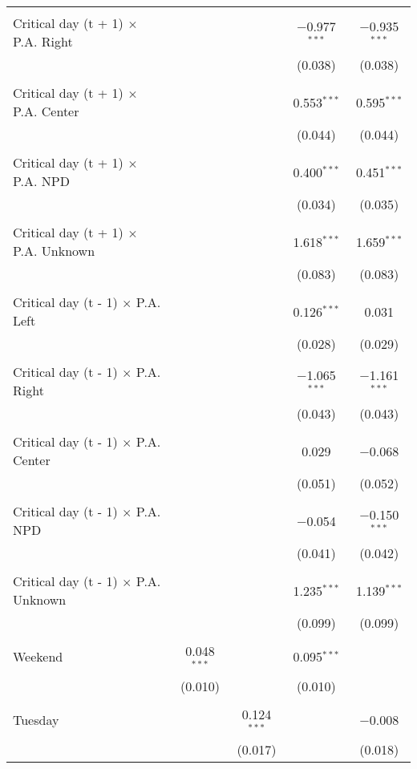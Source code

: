 \documentclass[
]{article}
\begin{document}
\begin{table}[!htbp]
{\begin{tabular}{@{\extracolsep{5pt}}lcccc}
  & & & & \\ 
 Critical day (t + 1) $\times$ P.A. Right &  &  & $-$0.977$^{***}$ & $-$0.935$^{***}$ \\ 
  &  &  & (0.038) & (0.038) \\ 
  & & & & \\ 
 Critical day (t + 1) $\times$ P.A. Center &  &  & 0.553$^{***}$ & 0.595$^{***}$ \\ 
  &  &  & (0.044) & (0.044) \\ 
  & & & & \\ 
 Critical day (t + 1) $\times$ P.A. NPD &  &  & 0.400$^{***}$ & 0.451$^{***}$ \\ 
  &  &  & (0.034) & (0.035) \\ 
  & & & & \\ 
 Critical day (t + 1) $\times$ P.A. Unknown &  &  & 1.618$^{***}$ & 1.659$^{***}$ \\ 
  &  &  & (0.083) & (0.083) \\ 
  & & & & \\ 
 Critical day (t - 1) $\times$ P.A. Left &  &  & 0.126$^{***}$ & 0.031 \\ 
  &  &  & (0.028) & (0.029) \\ 
  & & & & \\ 
 Critical day (t - 1) $\times$ P.A. Right &  &  & $-$1.065$^{***}$ & $-$1.161$^{***}$ \\ 
  &  &  & (0.043) & (0.043) \\ 
  & & & & \\ 
 Critical day (t - 1) $\times$ P.A. Center &  &  & 0.029 & $-$0.068 \\ 
  &  &  & (0.051) & (0.052) \\ 
  & & & & \\ 
 Critical day (t - 1) $\times$ P.A. NPD &  &  & $-$0.054 & $-$0.150$^{***}$ \\ 
  &  &  & (0.041) & (0.042) \\ 
  & & & & \\ 
 Critical day (t - 1) $\times$ P.A. Unknown &  &  & 1.235$^{***}$ & 1.139$^{***}$ \\ 
  &  &  & (0.099) & (0.099) \\ 
  & & & & \\ 
 Weekend & 0.048$^{***}$ &  & 0.095$^{***}$ &  \\ 
  & (0.010) &  & (0.010) &  \\ 
  & & & & \\ 
 Tuesday &  & 0.124$^{***}$ &  & $-$0.008 \\ 
  &  & (0.017) &  & (0.018) \\ 

\end{tabular}}
\end{table}
\end{document}
